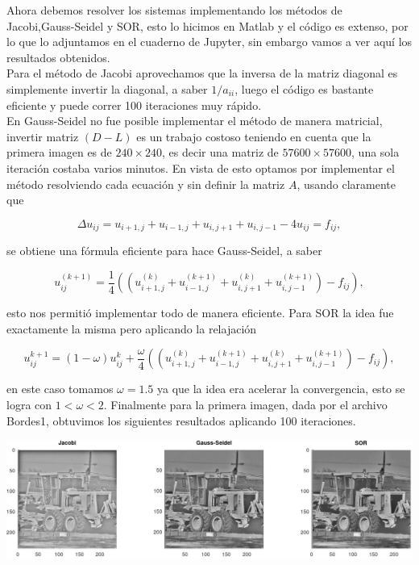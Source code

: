     Ahora debemos resolver los sistemas implementando los métodos de Jacobi,Gauss-Seidel y SOR, esto lo hicimos en Matlab y el código es extenso, por lo que lo adjuntamos en el cuaderno de Jupyter, sin embargo vamos a ver aquí los resultados obtenidos.\\

    Para el método de Jacobi aprovechamos que la inversa de la matriz diagonal es simplemente invertir la diagonal, a saber $1/a_{ii}$, luego el código es bastante eficiente y puede correr 100 iteraciones muy rápido. \\

    En Gauss-Seidel no fue posible implementar el método de manera  matricial, invertir matriz $(D-L)$ es un trabajo costoso teniendo en cuenta que la primera imagen es de $240\times 240$, es decir una matriz de $57600\times 57600$, una sola iteración costaba varios minutos. En vista de esto optamos por implementar el método resolviendo cada ecuación y sin definir la matriz $A$, usando claramente que 

     \[
    \Delta u_{ij} =  u_{i+1, j} + u_{i-1, j} + u_{i, j+1} + u_{i, j-1} - 4 u_{ij} = f_{ij},
    \]

    se obtiene una  fórmula eficiente para hace Gauss-Seidel, a saber

    $$u_{i j}^{(k+1)}=\frac{1}{4}\left(\left(u_{i+1, j}^{(k)}+u_{i-1, j}^{(k+1)}+u_{i, j+1}^{(k)}+u_{i, j-1}^{(k+1)}\right)-f_{i j}\right),$$

    esto nos permitió implementar todo de manera  eficiente. Para SOR la idea fue exactamente la misma pero aplicando la relajación 

    $$u_{ij}^{k+1}=(1-\omega )u_{ij}^{k}+\frac{\omega}{4}\left(\left(u_{i+1, j}^{(k)}+u_{i-1, j}^{(k+1)}+u_{i, j+1}^{(k)}+u_{i, j-1}^{(k+1)}\right)-f_{i j}\right),$$

    en este caso tomamos $\omega=1.5$ ya que la idea era acelerar  la convergencia, esto se logra con $1<\omega<2$. Finalmente para la primera imagen, dada por el archivo Bordes1, obtuvimos los siguientes resultados aplicando 100 iteraciones.

    \begin{center}
        \includegraphics[scale=0.27]{Graficas/Bordes1.jpg}
    \end{center}


